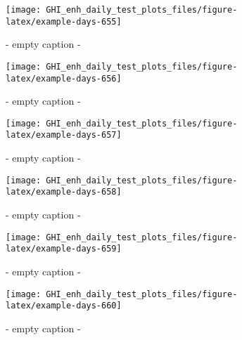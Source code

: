 \documentclass[
  10pt,
  a4paper,oneside]{article}
\begin{document}
\begin{figure}[H]

{\centering \texttt{[image: GHI\_enh\_daily\_test\_plots\_files/figure-latex/example-days-655]} 

}

\caption{ - empty caption - }\label{fig:example-days-655}
\end{figure}

\begin{figure}[H]

{\centering \texttt{[image: GHI\_enh\_daily\_test\_plots\_files/figure-latex/example-days-656]} 

}

\caption{ - empty caption - }\label{fig:example-days-656}
\end{figure}

\begin{figure}[H]

{\centering \texttt{[image: GHI\_enh\_daily\_test\_plots\_files/figure-latex/example-days-657]} 

}

\caption{ - empty caption - }\label{fig:example-days-657}
\end{figure}

\begin{figure}[H]

{\centering \texttt{[image: GHI\_enh\_daily\_test\_plots\_files/figure-latex/example-days-658]} 

}

\caption{ - empty caption - }\label{fig:example-days-658}
\end{figure}

\begin{figure}[H]

{\centering \texttt{[image: GHI\_enh\_daily\_test\_plots\_files/figure-latex/example-days-659]} 

}

\caption{ - empty caption - }\label{fig:example-days-659}
\end{figure}

\begin{figure}[H]

{\centering \texttt{[image: GHI\_enh\_daily\_test\_plots\_files/figure-latex/example-days-660]} 

}

\caption{ - empty caption - }\label{fig:example-days-660}
\end{figure}
\end{document}
